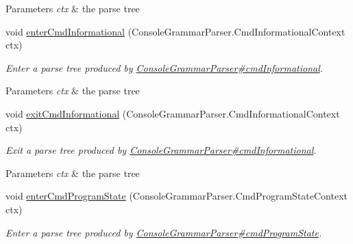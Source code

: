 \begin{DoxyCompactItemize}
\begin{DoxyCompactList}
\begin{DoxyParams}{Parameters}
{\em ctx} & the parse tree\\
\hline
\end{DoxyParams}
 \end{DoxyCompactList}\item 
void \hyperlink{classgov_1_1nasa_1_1jpf_1_1inspector_1_1client_1_1parser_1_1_console_grammar_base_listener_ae668fbb1acfabaa08099cf99d5b19299}{enter\+Cmd\+Informational} (Console\+Grammar\+Parser.\+Cmd\+Informational\+Context ctx)
\begin{DoxyCompactList}\small\item\em Enter a parse tree produced by \hyperlink{classgov_1_1nasa_1_1jpf_1_1inspector_1_1client_1_1parser_1_1_console_grammar_parser_ae35d1b2783eeb9483c0c5473bd4017e4}{Console\+Grammar\+Parser\#cmd\+Informational}.


\begin{DoxyParams}{Parameters}
{\em ctx} & the parse tree\\
\hline
\end{DoxyParams}
 \end{DoxyCompactList}\item 
void \hyperlink{classgov_1_1nasa_1_1jpf_1_1inspector_1_1client_1_1parser_1_1_console_grammar_base_listener_a731af1c7dc6d842d208fa9f064618a76}{exit\+Cmd\+Informational} (Console\+Grammar\+Parser.\+Cmd\+Informational\+Context ctx)
\begin{DoxyCompactList}\small\item\em Exit a parse tree produced by \hyperlink{classgov_1_1nasa_1_1jpf_1_1inspector_1_1client_1_1parser_1_1_console_grammar_parser_ae35d1b2783eeb9483c0c5473bd4017e4}{Console\+Grammar\+Parser\#cmd\+Informational}.


\begin{DoxyParams}{Parameters}
{\em ctx} & the parse tree\\
\hline
\end{DoxyParams}
 \end{DoxyCompactList}\item 
void \hyperlink{classgov_1_1nasa_1_1jpf_1_1inspector_1_1client_1_1parser_1_1_console_grammar_base_listener_a69183435ef10a84713506890b231cff2}{enter\+Cmd\+Program\+State} (Console\+Grammar\+Parser.\+Cmd\+Program\+State\+Context ctx)
\begin{DoxyCompactList}\small\item\em Enter a parse tree produced by \hyperlink{classgov_1_1nasa_1_1jpf_1_1inspector_1_1client_1_1parser_1_1_console_grammar_parser_ad1e3d393488b8ab29c12899535ecf1cd}{Console\+Grammar\+Parser\#cmd\+Program\+State}.



\end{DoxyCompactList}
\end{DoxyCompactItemize}
